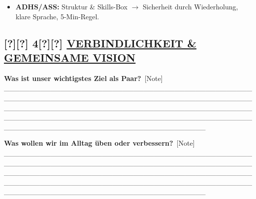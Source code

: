 \begin{itemize}
\tightlist
\item
  \textbf{ADHS/ASS:} Struktur \& Skills-Box $\rightarrow$ Sicherheit durch Wiederholung, klare Sprache, 5-Min-Regel.
\end{itemize}

\hypertarget{section-1}{%
\subsection{}\label{section-1}}

\hypertarget{section-2}{%
\subsection{}\label{section-2}}

\hypertarget{section-3}{%
\subsection{}\label{section-3}}

\hypertarget{verbindlichkeit-gemeinsame-vision-1}{%
\subsection{\texorpdfstring{[?][?] 4[?][?] \textbf{\ul{VERBINDLICHKEIT \& GEMEINSAME VISION}}}{[?][?] 4[?][?] VERBINDLICHKEIT \& GEMEINSAME VISION}}\label{verbindlichkeit-gemeinsame-vision-1}}

\textbf{Was ist unser wichtigstes Ziel als Paar?}\
[Note] \_\_\_\_\_\_\_\_\_\_\_\_\_\_\_\_\_\_\_\_\_\_\_\_\_\_\_\_\_\_\_\_\_\_\_\_\_\_\_\_\_\_\_\_\_\_\_\_\_\_\_\_\_\_\_\_\_\_\_\_\_\_\_\_\_\_\_\_\_\_\_\_\_\_\_\_\_\_\_\_\_\_\_\_\_\_\_\_\_\_\_\_\_\_\_\_\_\_\_\_\_\_\_\_\_\_\_\_\_\_\_\_\_\_\_\_\_\_\_\_\_\_\_\_\_\_\_\_\_\_\_\_\_\_\_\_\_\_\_\_\_\_\_\_\_\_\_\_\_\_\_\_\_\_\_\_\_\_\_\_\_\_\_\_\_\_\_\_\_\_\_\_\_\_\_\_\_\_\_\_\_\_\_\_\_\_\_\_\_\_\_\_\_\_\_\_\_\_\_\_\_\_\_\_\_\_\_\_\_\_\_\_\_\_\_\_\_\_\_\_\_\_\_\_\_\_\_\_\_\_\_

\textbf{Was wollen wir im Alltag üben oder verbessern?}\
[Note] \_\_\_\_\_\_\_\_\_\_\_\_\_\_\_\_\_\_\_\_\_\_\_\_\_\_\_\_\_\_\_\_\_\_\_\_\_\_\_\_\_\_\_\_\_\_\_\_\_\_\_\_\_\_\_\_\_\_\_\_\_\_\_\_\_\_\_\_\_\_\_\_\_\_\_\_\_\_\_\_\_\_\_\_\_\_\_\_\_\_\_\_\_\_\_\_\_\_\_\_\_\_\_\_\_\_\_\_\_\_\_\_\_\_\_\_\_\_\_\_\_\_\_\_\_\_\_\_\_\_\_\_\_\_\_\_\_\_\_\_\_\_\_\_\_\_\_\_\_\_\_\_\_\_\_\_\_\_\_\_\_\_\_\_\_\_\_\_\_\_\_\_\_\_\_\_\_\_\_\_\_\_\_\_\_\_\_\_\_\_\_\_\_\_\_\_\_\_\_\_\_\_\_\_\_\_\_\_\_\_\_\_\_\_\_\_\_\_\_\_\_\_\_\_\_\_\_\_\_\_\_

